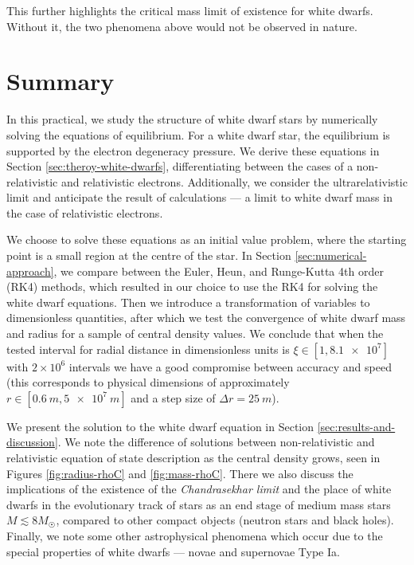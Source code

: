 \documentclass[]{article}
\begin{document}
	This further highlights the critical mass limit of existence for white dwarfs. Without it, the two phenomena above would not be observed in nature.

\section{Summary}\label{sec:summary}
	In this practical, we study the structure of white dwarf stars by numerically solving the equations of equilibrium. For a white dwarf star, the equilibrium is supported by the electron degeneracy pressure. We derive these equations in Section \ref{sec:theroy-white-dwarfs}, differentiating between the cases of a non-relativistic and relativistic electrons. Additionally, we consider the ultrarelativistic limit and anticipate the result of calculations --- a limit to white dwarf mass in the case of relativistic electrons.
	
	We choose to solve these equations as an initial value problem, where the starting point is a small region at the centre of the star. In Section \ref{sec:numerical-approach}, we compare between the Euler, Heun, and Runge-Kutta 4th order (RK4) methods, which resulted in our choice to use the RK4 for solving the white dwarf equations. Then we introduce a transformation of variables to dimensionless quantities, after which we test the convergence of white dwarf mass and radius for a sample of central density values. We conclude that when the tested interval for radial distance in dimensionless units is $\xi \in \left[ 1, \num{8.1e7}\right]$ with $2 \times 10^6$ intervals we have a good compromise between accuracy and speed (this corresponds to physical dimensions of approximately $r \in \left[\SI{0.6}{m}, \SI{5e7}{m}\right]$ and a step size of $\Delta r = \SI{25}{m}$).

	We present the solution to the white dwarf equation in Section \ref{sec:results-and-discussion}. We note the difference of solutions between non-relativistic and relativistic equation of state description as the central density grows, seen in Figures \ref{fig:radius-rhoC} and \ref{fig:mass-rhoC}. There we also discuss the implications of the existence of the \emph{Chandrasekhar limit} and the place of white dwarfs in the evolutionary track of stars as an end stage of medium mass stars $M \lesssim 8 M_{\astrosun}$, compared to other compact objects (neutron stars and black holes). Finally, we note some other astrophysical phenomena which occur due to the special properties of white dwarfs --- novae and supernovae Type Ia.
\end{document}
